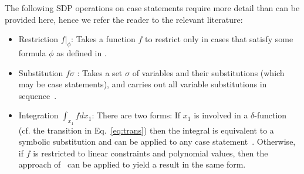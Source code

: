 \documentclass{article} %
\begin{document}
The following SDP operations on case statements require more detail than can be provided here, hence we refer the reader to the relevant literature:
\begin{itemize}
\item Restriction $f|_{\phi}$:  Takes a function $f$ to restrict only in cases
that satisfy some formula $\phi$ as defined in \cite{sanner_uai11}.
\item Substitution $f\sigma$ : Takes a set $\sigma$ of variables and their substitutions (which may be case statements), and carries out all variable substitutions in sequence~\cite{sanner_uai11}.
\item Integration $\int_{x_1} f dx_1$:  There are two forms: If $x_1$ is involved in a $\delta$-function (cf. the transition in Eq.~\eqref{eq:trans}) then the integral is equivalent to a symbolic substitution and can be applied to any case statement~\cite{sanner_uai11}. Otherwise, if $f$ is restricted to linear constraints and polynomial values, then the approach of~\cite{sanner_aaai12} can be applied to yield a result in the same form.
\end{itemize}
\end{document}
